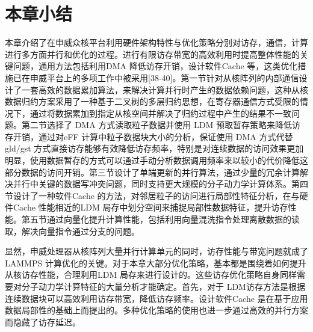 \section{本章小结}
本章介绍了在申威众核平台利用硬件架构特性与优化策略分别对访存，通信，计算进行多方面并行和优化的过程。进行有限访存带宽的高效利用时提高整体性能的关键问题，通用方法包括利用DMA 降低访存开销，设计软件Cache 等，这类优化措施已在申威平台上的多项工作中被采用[38-40]。第一节针对从核阵列的内部通信设计了一套高效的数据累加算法，来解决计算并行时产生的数据依赖问题，这种从核数据归约方案采用了一种基于二叉树的多层归约思想，在寄存器通信方式受限的情况下，通过将数据累加到指定从核空间并解决了归约过程中产生的结果不一致问题。第二节选择了 DMA 方式读取粒子数据并使用 LDM 预取暂存策略来降低访存开销，通过对eFF 计算中粒子数据块大小的分析，保证使用 DMA 方式代替 gld/gst 方式直接访存能够有效降低访存频率，特别是对连续数据的访问效果更加明显，使用数据暂存的方式可以通过手动分析数据调用频率来以较小的代价降低这部分数据的访问开销。第三节设计了单端更新的并行算法，通过少量的冗余计算解决并行中关键的数据写冲突问题，同时支持更大规模的分子动力学计算体系。第四节设计了一种软件Cache 的方法，对邻居粒子的访问进行局部性特征分析，在与硬件Cache 性能相近的LDM 局存中划分空间来捕捉局部性数据特征，提升访存性能。第五节通过向量化提升计算性能，包括利用向量混洗指令处理离散数据的读取，解决向量指令通过分支的问题。

显然，申威处理器从核阵列大量并行计算单元的同时，访存性能与带宽问题就成了LAMMPS 计算优化的关键。对于本章大部分优化策略，基本都是围绕着如何提升从核访存性能，合理利用LDM 局存来进行设计的。这些访存优化策略自身同样需要对分子动力学计算特征的大量分析才能确定。首先，对于 LDM访存方法是根据连续数据块可以高效利用访存带宽，降低访存频率。设计软件Cache 是在基于应用数据局部性的基础上而提出的。多种优化策略的使用也进一步通过高效的并行方案而隐藏了访存延迟。
